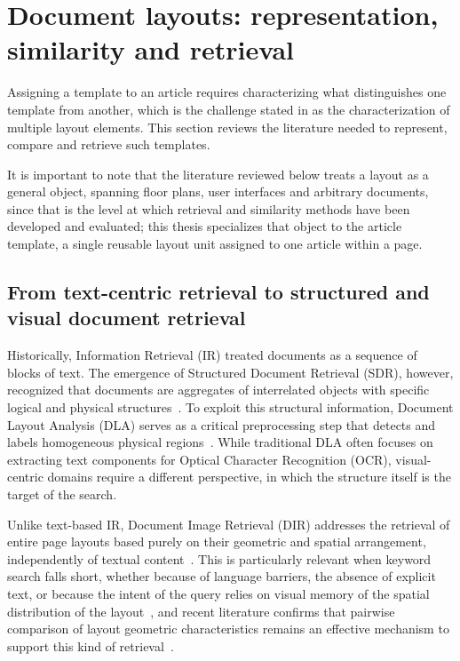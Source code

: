 
\section{Document layouts: representation, similarity and retrieval}
\label{sec:sota-retrieval}

Assigning a template to an article requires characterizing what distinguishes one template from another, which is the challenge stated in  as the characterization of multiple layout elements. This section reviews the literature needed to represent, compare and retrieve such templates. 

It is important to note that the literature reviewed below treats a layout as a general object, spanning floor plans, user interfaces and arbitrary documents, since that is the level at which retrieval and similarity methods have been developed and evaluated; this thesis specializes that object to the article template, a single reusable layout unit assigned to one article within a page.

\subsection{From text-centric retrieval to structured and visual document retrieval}
\label{sec:sota-sdr}

Historically, Information Retrieval (IR) treated documents as a sequence of blocks of text. The emergence of Structured Document Retrieval (SDR), however, recognized that documents are aggregates of interrelated objects with specific logical and physical structures~\cite{chiaramella-sdr-2001}. To exploit this structural information, Document Layout Analysis (DLA) serves as a critical preprocessing step that detects and labels homogeneous physical regions~\cite{binmakhashen-survey-2019}. While traditional DLA often focuses on extracting text components for Optical Character Recognition (OCR), visual-centric domains require a different perspective, in which the structure itself is the target of the search.

Unlike text-based IR, Document Image Retrieval (DIR) addresses the retrieval of entire page layouts based purely on their geometric and spatial arrangement, independently of textual content~\cite{yan-geometric-2013, vanbeusekom-distance-2006}. This is particularly relevant when keyword search falls short, whether because of language barriers, the absence of explicit text, or because the intent of the query relies on visual memory of the spatial distribution of the layout~\cite{yan-geometric-2013}, and recent literature confirms that pairwise comparison of layout geometric characteristics remains an effective mechanism to support this kind of retrieval~\cite{jaha-comparative-2024}.


